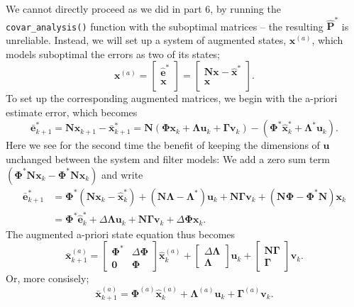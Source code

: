 \documentclass[11pt]{article}
\begin{document}
We cannot directly proceed as we did in part 6, by running the
\texttt{covar\_analysis()} function with the suboptimal matrices -- the
resulting \(\hat{\mathbf{P}}^*\) is unreliable. Instead, we will set up
a system of augmented states, \(\mathbf{x}^{(a)}\), which models
suboptimal the errors as two of its states; \[
\mathbf{x}^{(a)} = 
\begin{bmatrix}
\hat{\mathbf{e}}^* \\
\mathbf{x} \\
\end{bmatrix}
=
\begin{bmatrix}
\mathbf{Nx} - \hat{\mathbf{x}}^* \\
\mathbf{x} \\
\end{bmatrix}.
\] To set up the corresponding augmented matrices, we begin with the
a-priori estimate error, which becomes \[
\bar{\mathbf{e}}_{k+1}^* = \mathbf{Nx}_{k+1} - \bar{\mathbf{x}}_{k+1}^* = \mathbf{N} (\mathbf{\Phi}\mathbf{x}_k + \mathbf{\Lambda}\mathbf{u}_k + \mathbf{\Gamma}\mathbf{v}_k) - (\mathbf{\Phi}^*\hat{\mathbf{x}}^*_k + \mathbf{\Lambda}^*\mathbf{u}_k).
\] Here we see for the second time the benefit of keeping the dimensions
of \(\mathbf{u}\) unchanged between the system and filter models: We add
a zero sum term
\((\mathbf{\Phi}^*\mathbf{N}\mathbf{x}_k - \mathbf{\Phi}^*\mathbf{N}\mathbf{x}_k)\)
and write \[
\begin{aligned}
\bar{\mathbf{e}}_{k+1}^* &= \mathbf{\Phi}^*(\mathbf{N}\mathbf{x}_k - \hat{\mathbf{x}}^*_k) + (\mathbf{N \Lambda} - \mathbf{\Lambda}^*)\mathbf{u}_k + \mathbf{N \Gamma}\mathbf{v}_k + (\mathbf{N \Phi} - \mathbf{\Phi}^*\mathbf{N})\mathbf{x}_k \\
&= \mathbf{\Phi}^*\hat{\mathbf{e}}^*_k + \Delta \mathbf{\Lambda} \mathbf{u}_k + \mathbf{N \Gamma}\mathbf{v}_k + \Delta \mathbf{\Phi} \mathbf{x}_k.
\end{aligned}
\] The augmented a-priori state equation thus becomes \[
\bar{\mathbf{x}}^{(a)}_{k+1} = 
\begin{bmatrix}
\mathbf{\Phi}^* & \Delta \mathbf{\Phi} \\
\mathbf{0} & \mathbf{\Phi}
\end{bmatrix}
\hat{\mathbf{x}}^{(a)}_k
+
\begin{bmatrix}
\Delta \mathbf{\Lambda} \\ \mathbf{\Lambda}
\end{bmatrix}
\mathbf{u}_k
+
\begin{bmatrix}
\mathbf{N \Gamma} \\ \mathbf{\Gamma}
\end{bmatrix}
\mathbf{v}_k.
\] Or, more consisely; \[
\bar{\mathbf{x}}^{(a)}_{k+1} = \mathbf{\Phi}^{(a)} \hat{\mathbf{x}}^{(a)}_k + \mathbf{\Lambda}^{(a)} \mathbf{u}_k + \mathbf{\Gamma}^{(a)} \mathbf{v}_k.
\]
\end{document}

